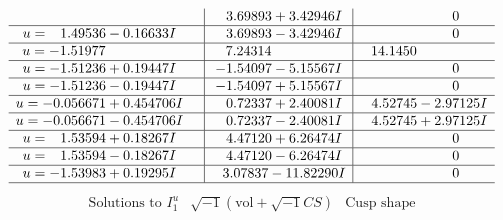 \documentclass[1p]{elsarticle_modified}
\theoremstyle{definition}
\newcommand{\I}{\sqrt{-1}}
\begin{document}
$$\begin{array}{c|c|c}
 & \phantom{-}3.69893 + 3.42946 I & \phantom{-0.000000 } 0 \\ \hline\begin{aligned}
u &= \phantom{-}1.49536 - 0.16633 I\end{aligned}
 & \phantom{-}3.69893 - 3.42946 I & \phantom{-0.000000 } 0 \\ \hline\begin{aligned}
u &= -1.51977\phantom{ +0.000000I}\end{aligned}
 & \phantom{-}7.24314\phantom{ +0.000000I} & \phantom{-}14.1450\phantom{ +0.000000I} \\ \hline\begin{aligned}
u &= -1.51236 + 0.19447 I\end{aligned}
 & -1.54097 - 5.15567 I & \phantom{-0.000000 } 0 \\ \hline\begin{aligned}
u &= -1.51236 - 0.19447 I\end{aligned}
 & -1.54097 + 5.15567 I & \phantom{-0.000000 } 0 \\ \hline\begin{aligned}
u &= -0.056671 + 0.454706 I\end{aligned}
 & \phantom{-}0.72337 + 2.40081 I & \phantom{-}4.52745 - 2.97125 I \\ \hline\begin{aligned}
u &= -0.056671 - 0.454706 I\end{aligned}
 & \phantom{-}0.72337 - 2.40081 I & \phantom{-}4.52745 + 2.97125 I \\ \hline\begin{aligned}
u &= \phantom{-}1.53594 + 0.18267 I\end{aligned}
 & \phantom{-}4.47120 + 6.26474 I & \phantom{-0.000000 } 0 \\ \hline\begin{aligned}
u &= \phantom{-}1.53594 - 0.18267 I\end{aligned}
 & \phantom{-}4.47120 - 6.26474 I & \phantom{-0.000000 } 0 \\ \hline\begin{aligned}
u &= -1.53983 + 0.19295 I\end{aligned}
 & \phantom{-}3.07837 - 11.82290 I & \phantom{-0.000000 } 0\\
 \hline 
 \end{array}$$\newpage$$\begin{array}{c|c|c}  
\text{Solutions to }I^u_{1}& \I (\text{vol} + \sqrt{-1}CS) & \text{Cusp shape}\\

\end{array}$$
\end{document}

